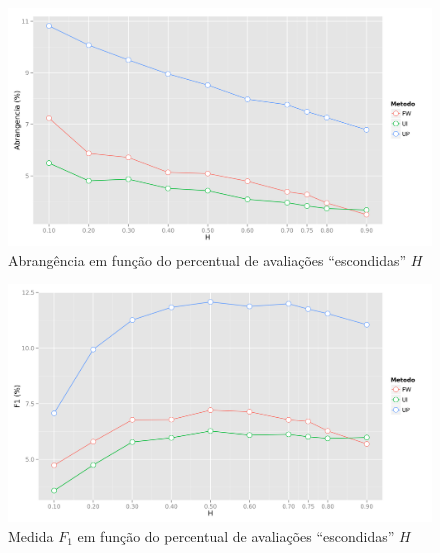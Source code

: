 \begin{figure}[htp]
    \begin{center}
    \includegraphics[width=1\textwidth]{img/recall_H}
    \end{center}
    \caption{Abrangência em função do percentual de avaliações ``escondidas'' $H$}
    \label{fig:recall_H}
\end{figure}

\begin{figure}[htp]
    \begin{center}
    \includegraphics[width=1\textwidth]{img/F1_H}
    \end{center}
    \caption{Medida $F_1$ em função do percentual de avaliações ``escondidas'' $H$}
    \label{fig:F1_H}
\end{figure}

